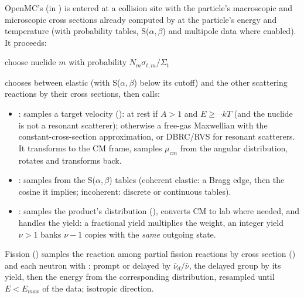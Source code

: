 OpenMC's  (in ) is entered at a collision site with the
particle's macroscopic and microscopic cross sections already computed by
 at the particle's energy and temperature (with probability tables,
S($\alpha,\beta$) and multipole data where enabled). It proceeds:

\begin{algorithm}[h]
\caption{OpenMC's analog neutron collision (simplified)}
\DontPrintSemicolon
choose nuclide $m$ with probability $N_m\sigma_{t,m}/\Sigma_t$ 
\end{algorithm}

 chooses between elastic (with S($\alpha,\beta$) below its cutoff) and the other
scattering reactions by their cross sections, then calls:
\begin{itemize}
\item \textbf{}: samples a target velocity ():
  at rest if $A>1$ and $E\ge$ $\cdot kT$ (and the nuclide is not a
  resonant scatterer); otherwise a free-gas Maxwellian with the constant-cross-section approximation,
  or DBRC/RVS for resonant scatterers. It transforms to the CM frame, samples $\mu_{cm}$ from the
  angular distribution, rotates and transforms back.
\item \textbf{}: samples from the S($\alpha,\beta$) tables (coherent elastic: a
  Bragg edge, then the cosine it implies; incoherent: discrete or continuous tables).
\item \textbf{}: samples the product's distribution (),
  converts CM to lab where needed, and handles the yield: a fractional yield multiplies the weight,
  an integer yield $\nu>1$ banks $\nu-1$ copies with the \emph{same} outgoing state.
\end{itemize}
Fission () samples the reaction among partial fission reactions by
cross section () and each neutron with : prompt
or delayed by $\bar\nu_d/\bar\nu$, the delayed group by its yield, then the energy from the
corresponding distribution, resampled until $E<E_{max}$ of the data; isotropic direction.

